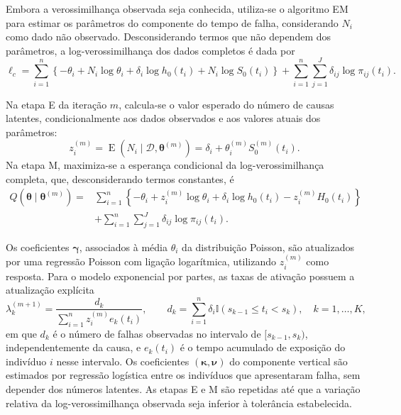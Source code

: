 \documentclass[11pt,a4paper]{article}
\begin{document}
Embora a verossimilhança observada seja conhecida, utiliza-se o algoritmo EM para estimar os parâmetros do componente do tempo de falha, considerando $N_i$ como dado não observado. Desconsiderando termos que não dependem dos parâmetros, a log-verossimilhança dos dados completos é dada por
\begin{equation}
\ell_c=
\sum_{i=1}^{n}\left\{-\theta_i+N_i\log\theta_i
+\delta_i\log h_0(t_i)+N_i\log S_0(t_i)\right\}
+\sum_{i=1}^{n}\sum_{j=1}^{J}\delta_{ij}\log\pi_{ij}(t_i).
\end{equation}

Na etapa E da iteração $m$, calcula-se o valor esperado do número de causas latentes, condicionalmente aos dados observados e aos valores atuais dos parâmetros:
\begin{equation}
z_i^{(m)}
=\operatorname E\!\left(N_i\mid\mathcal{D},\boldsymbol\theta^{(m)}\right)
=\delta_i+\theta_i^{(m)}S_0^{(m)}\!\left(t_i\right).
\end{equation}
Na etapa M, maximiza-se a esperança condicional da log-verossimilhança completa, que, desconsiderando termos constantes, é
\begin{equation}
\begin{aligned}
Q(\boldsymbol\theta\mid\boldsymbol\theta^{(m)})
={}&\sum_{i=1}^{n}\left\{-\theta_i+z_i^{(m)}\log\theta_i
+\delta_i\log h_0(t_i)-z_i^{(m)}H_0(t_i)\right\}\\
&+\sum_{i=1}^{n}\sum_{j=1}^{J}\delta_{ij}\log\pi_{ij}(t_i).
\end{aligned}
\end{equation}

Os coeficientes $\boldsymbol\gamma$, associados à média $\theta_i$ da distribuição Poisson, são atualizados por uma regressão Poisson com ligação logarítmica, utilizando $z_i^{(m)}$ como resposta. Para o modelo exponencial por partes, as taxas de ativação possuem a atualização explícita
\begin{equation}
\lambda_k^{(m+1)}
=\frac{d_k}{\displaystyle\sum_{i=1}^{n}z_i^{(m)}e_k(t_i)},
\qquad
 d_k=\sum_{i=1}^{n}\delta_i \mathbb{I}(s_{k-1}\leq t_i< s_k),
\quad k=1,\ldots,K,
\end{equation}
\noindent em que $d_k$ é o número de falhas observadas no intervalo de $[s_{k-1}, s_k)$, independentemente da causa, e $e_k(t_i)$ é o tempo acumulado de exposição do indivíduo $i$ nesse intervalo. Os coeficientes $(\boldsymbol\kappa,\boldsymbol\nu)$ do componente vertical são estimados por regressão logística entre os indivíduos que apresentaram falha, sem depender dos números latentes. As etapas E e M são repetidas até que a variação relativa da log-verossimilhança observada seja inferior à tolerância estabelecida.
\end{document}
